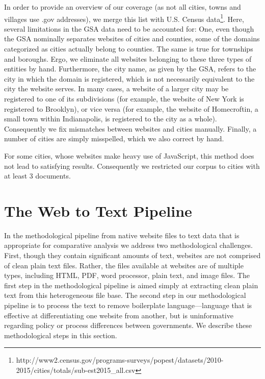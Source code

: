 \documentclass[11pt]{article}
\begin{document}
In order to provide an overview of our coverage (as not all cities, towns and villages use .gov addresses), we merge this list with U.S. Census data\footnote{http://www2.census.gov/programs-surveys/popest/datasets/2010-2015/cities/totals/sub-est2015\_all.csv}. Here, several limitations in the GSA data need to be accounted for: One, even though the GSA nominally separates websites of cities and counties, some of the domains categorized as cities actually belong to counties. The same is true for townships and boroughs. Ergo, we eliminate all websites belonging to these three types of entities by hand. Furthermore, the city name, as given by the GSA, refers to the city in which the domain is registered, which is not necessarily equivalent to the city the website serves. In many cases, a website of a larger city may be registered to one of its subdivisions (for example, the website of New York is registered to Brooklyn), or vice versa (for example, the website of Homecroftin, a small town within Indianapolis, is registered to the city as a whole). Consequently we fix mismatches between websites and cities manually. Finally, a number of cities are simply misspelled, which we also correct by hand.



\begin{landscape}

\end{landscape}

For some cities, whose websites make heavy use of JavaScript, this method does not lead to satisfying results. Consequently we restricted our corpus to cities with at least 3 documents.


\section{The Web to Text Pipeline}

In the methodological pipeline from native website files to text data that is appropriate for comparative analysis we address two methodological challenges. First, though they contain significant amounts of text, websites are not comprised of clean plain text files. Rather, the files available at websites are of multiple types, including HTML, PDF, word processor, plain text, and image files. The first step in the methodological pipeline is aimed simply at extracting clean plain text from this heterogeneous file base. The second step in our methodological pipeline is to process the text to remove boilerplate language---language that is effective at differentiating one website from another, but is uninformative regarding policy or process differences between governments. We describe these methodological steps in this section.
\end{document}
